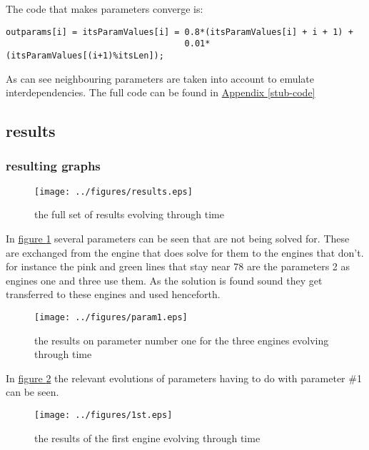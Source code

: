 \documentclass[]{lofar}
\begin{document}
        The code that makes parameters converge is:

\begin{Verbatim}[]
outparams[i] = itsParamValues[i] = 0.8*(itsParamValues[i] + i + 1) +
                                   0.01*(itsParamValues[(i+1)%itsLen]);
\end{Verbatim}

        As can see neighbouring parameters are taken into account to
        emulate interdependencies. The full code can be found in
        \hyperlink{stub-code}{Appendix {\ref*{stub-code}}}

    \subsection{results}
    \label{id2721411}\hypertarget{id2721411}{}%

      \subsubsection{resulting graphs}

      \begin{figure}
        \texttt{[image: ../figures/results.eps]}
        \hypertarget{results}{}%
        \caption{the full set of results evolving through time\label{results}}
      \end{figure}

      In \hyperlink{results}{figure \ref{results}} several parameters
      can be seen that are not being solved for. These are exchanged
      from the engine that does solve for them to the engines that
      don't. for instance the pink and green lines that stay near 78
      are the parameters 2 as engines one and three use them. As the
      solution is found sound they get transferred to these engines
      and used henceforth.

      \begin{figure}
        \texttt{[image: ../figures/param1.eps]}
        \hypertarget{param1}{}%
        \caption{the results on parameter number one for the three engines evolving through time\label{param1}}
      \end{figure}

      In \hyperlink{param1}{figure \ref{param1}} the relevant
      evolutions of parameters having to do with parameter \#1 can be
      seen.

      \begin{figure}
        \texttt{[image: ../figures/1st.eps]}
        \hypertarget{1st}{}%
        \caption{the results of the first engine evolving through time\label{1st}}
      \end{figure}
\end{document}
